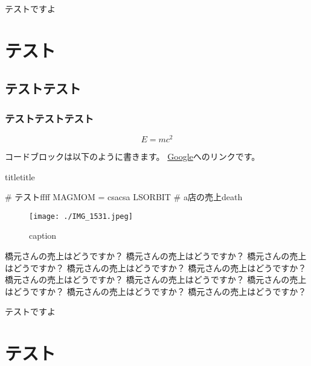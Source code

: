 \documentclass[book,openany,fontsize=11pt,jafontscale=0.925,titlepage]{jlreq}
\makeatletter
\renewcommand{\chapter}{
  \addtocontents{toc}{\vspace{10pt}} %
  \secdef\@chapter\@schapter
}
\makeatother
\begin{document}


\tableofcontents
\newpage

\chapter{テストですよ}
\section{テスト}
\subsection{テストテスト}
\subsubsection{テストテストテスト}

\begin{equation}
E = mc^2
\end{equation}

コードブロックは以下のように書きます。
\href{https://google.com}{Google}へのリンクです。

\begin{customcodeframe}{titletitle}
  \begin{customcodecontents}
    # テストffff
    MAGMOM = csacsa
    LSORBIT # a店の売上death
  \end{customcodecontents}
\end{customcodeframe}

\begin{figure}[h]
  \centering
  \texttt{[image: ./IMG\_1531.jpeg]}
  \caption{caption}
  \label{fig:label}
\end{figure}

橋元さんの売上はどうですか？
橋元さんの売上はどうですか？
橋元さんの売上はどうですか？
橋元さんの売上はどうですか？
橋元さんの売上はどうですか？
橋元さんの売上はどうですか？
橋元さんの売上はどうですか？
橋元さんの売上はどうですか？
橋元さんの売上はどうですか？
橋元さんの売上はどうですか？

\chapter{テストですよ}
\section{テスト}
\end{document}

